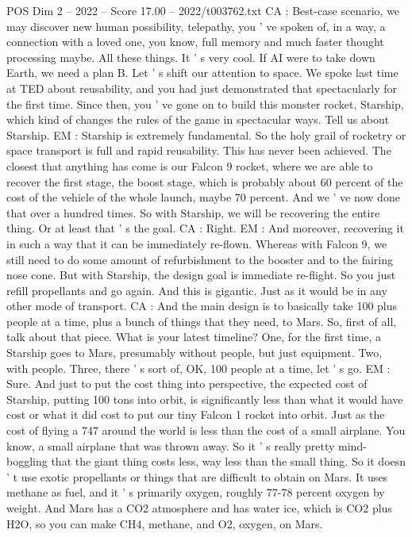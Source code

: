 \begin{textsample}{POS Dim 2 – 2022 – Score 17.00 – 2022/t003762.txt}
CA : Best-case scenario, we may discover new human possibility, telepathy, you ' ve spoken of, in a way, a connection with a loved one, you know, full memory and much faster thought processing maybe.
All these things.
It ' s very cool.
If AI were to take down Earth, we need a plan B.
Let ' s shift our attention to space.
We spoke last time at TED about reusability, and you had just demonstrated that spectacularly for the first time.
Since then, you ' ve gone on to build this monster rocket, Starship, which kind of changes the rules of the game in spectacular ways.
Tell us about Starship.
EM : Starship is extremely fundamental.
So the holy grail of rocketry or space transport is full and rapid reusability.
This has never been achieved.
The closest that anything has come is our Falcon 9 rocket, where we are able to recover the first stage, the boost stage, which is probably about 60 percent of the cost of the vehicle of the whole launch, maybe 70 percent.
And we ' ve now done that over a hundred times.
So with Starship, we will be recovering the entire thing.
Or at least that ' s the goal.
CA : Right.
EM : And moreover, recovering it in such a way that it can be immediately re-flown.
Whereas with Falcon 9, we still need to do some amount of refurbishment to the booster and to the fairing nose cone.
But with Starship, the design goal is immediate re-flight.
So you just refill propellants and go again.
And this is gigantic.
Just as it would be in any other mode of transport.
CA : And the main design is to basically take 100 plus people at a time, plus a bunch of things that they need, to Mars.
So, first of all, talk about that piece.
What is your latest timeline?
One, for the first time, a Starship goes to Mars, presumably without people, but just equipment.
Two, with people.
Three, there ' s sort of, OK, 100 people at a time, let ' s go.
EM : Sure.
And just to put the cost thing into perspective, the expected cost of Starship, putting 100 tons into orbit, is significantly less than what it would have cost or what it did cost to put our tiny Falcon 1 rocket into orbit.
Just as the cost of flying a 747 around the world is less than the cost of a small airplane.
You know, a small airplane that was thrown away.
So it ' s really pretty mind-boggling that the giant thing costs less, way less than the small thing.
So it doesn ' t use exotic propellants or things that are difficult to obtain on Mars.
It uses methane as fuel, and it ' s primarily oxygen, roughly 77-78 percent oxygen by weight.
And Mars has a CO2 atmosphere and has water ice, which is CO2 plus H2O, so you can make CH4, methane, and O2, oxygen, on Mars.

\end{textsample}
